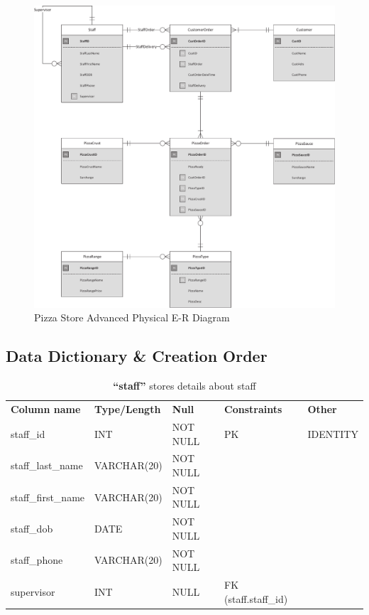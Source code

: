 \begin{figure}[H]
\centering
\caption{Pizza Store Advanced Physical E-R Diagram}
\includegraphics[scale=0.5]{./img/CSG1207_A1_PONCE_TASK_4_ADVPER_PIZZA.pdf}
\end{figure}

\newpage
\subsection{Data Dictionary \& Creation Order}

\begin{table}[H]
  \centering
  \caption{\textbf{``staff''} stores details about staff}
    \begin{tabular}{lllll}
    \textbf{Column name} & \textbf{Type/Length} & \textbf{Null} & \textbf{Constraints} & \textbf{Other} \\
    staff\_id & INT   & NOT NULL & PK    & IDENTITY \\
    staff\_last\_name & VARCHAR(20) & NOT NULL &       &  \\
    staff\_first\_name & VARCHAR(20) & NOT NULL &       &  \\
    staff\_dob & DATE  & NOT NULL &       &  \\
    staff\_phone & VARCHAR(20) & NOT NULL &       &  \\
    supervisor & INT   & NULL & FK (staff.staff\_id) &  \\
    \end{tabular}%
  \label{tab:addlabel}%
\end{table}%

